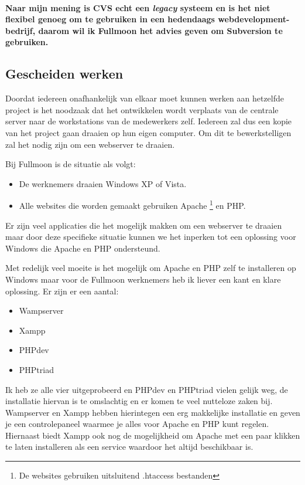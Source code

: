 \documentclass[12pt,a4paper]{article}
\begin{document}
    \paragraph{Naar mijn mening is CVS echt een \emph{legacy} systeem en is het niet flexibel genoeg om te gebruiken in een hedendaags webdevelopment-bedrijf, daarom wil ik Fullmoon het advies geven om Subversion te gebruiken.}
    
    \subsection{Gescheiden werken}
    
    Doordat iedereen onafhankelijk van elkaar moet kunnen werken aan hetzelfde project is het noodzaak dat het ontwikkelen wordt verplaats van de centrale server naar de workstations van de medewerkers zelf. Iedereen zal dus een kopie van het project gaan draaien op hun eigen computer. Om dit te bewerkstelligen zal het nodig zijn om een webserver te draaien.
    
    Bij Fullmoon is de situatie als volgt:
    
    \begin{itemize}
      \item De werknemers draaien Windows XP of Vista.
      \item Alle websites die worden gemaakt gebruiken Apache \footnote{De websites gebruiken uitsluitend .htaccess bestanden} en PHP.
    \end{itemize}
    
    Er zijn veel applicaties die het mogelijk makken om een webserver te draaien maar door deze specifieke situatie kunnen we het inperken tot een oplossing voor Windows die Apache en PHP ondersteund.
    
    Met redelijk veel moeite is het mogelijk om Apache en PHP zelf te installeren op Windows maar voor de Fullmoon werknemers heb ik liever een kant en klare oplossing. Er zijn er een aantal:
    
    \begin{itemize}
      \item Wampserver
      \item Xampp
      \item PHPdev
      \item PHPtriad
    \end{itemize}
    
    Ik heb ze alle vier uitgeprobeerd en PHPdev en PHPtriad vielen gelijk weg, de installatie hiervan is te omslachtig en er komen te veel nutteloze zaken bij. Wampserver en Xampp hebben hierintegen een erg makkelijke installatie en geven je een controlepaneel waarmee je alles voor Apache en PHP kunt regelen. Hiernaast biedt Xampp ook nog de mogelijkheid om Apache met een paar klikken te laten installeren als een service waardoor het altijd beschikbaar is.
    
\end{document}
